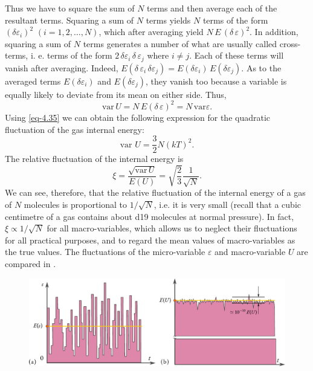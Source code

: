 Thus we have to square the sum of $N$ terms and then average each of the resultant terms. Squaring a sum of $N$ terms yields $N$ terms of the form $(\delta \varepsilon_{i})^{2} \,\, (i = 1, 2,\ldots, N)$, which after averaging yield $N\,E\,(\delta \,\varepsilon)^{2}$. In addition, squaring a sum of $N$ terms generates a number of what are usually called cross-terms, i. e. terms of the form $2 \, \delta \varepsilon_{i}  \, \delta \, \varepsilon_{j} $ where $i \neq j$. Each of these terms will vanish after averaging. Indeed,	$E (\delta \,\varepsilon_{i}  \, \delta  \varepsilon_{j}) = E(\delta \varepsilon_{i})  \, E(\delta  \varepsilon_{j})$. As to the averaged terms $ E(\delta \varepsilon_{i}) $ and $ E(\delta \varepsilon_{j}) $, they vanish too because a variable is equally likely to deviate from its mean on
either side. Thus, 
\begin{equation}%
\textrm{var} \, U =  N \, E ( \delta \, \varepsilon)^{2} = N \, \textrm{var} \varepsilon.
\label{eq-4.41}
\end{equation}
Using \eqref{eq-4.35} we can obtain the following expression for the quadratic fluctuation of the gas internal energy:
\begin{equation}%
\text{var} \,\, U= \frac{3}{2} N(kT)^{2}.
\label{eq-4.42}
\end{equation}
The relative fluctuation of the internal energy is
\begin{equation}%
\xi = \frac{\sqrt{\text{var} \, U}}{E(U)} = \sqrt{\frac{2}{3}} \frac{1}{\sqrt{N}}.
\label{eq-4.43}
\end{equation}
We can see, therefore, that the relative fluctuation of the internal energy of a gas of $N$ molecules is proportional to $1 /\sqrt{N}$, i.e. it is very small (recall that a cubic centimetre of a gas contains about \num{d19} molecules at normal pressure). In fact, $\xi \propto  1 / \sqrt{N}$ for all macro-variables, which allows us to neglect their fluctuations for all practical purposes, and to regard the mean values of macro-variables as the true values. The fluctuations of the micro-variable	$\varepsilon$ and	macro-variable $U$ are compared	 in .

\begin{figure}%
\includegraphics[width=1.4\textwidth]{figures/macro-micro.pdf}
\end{figure}

